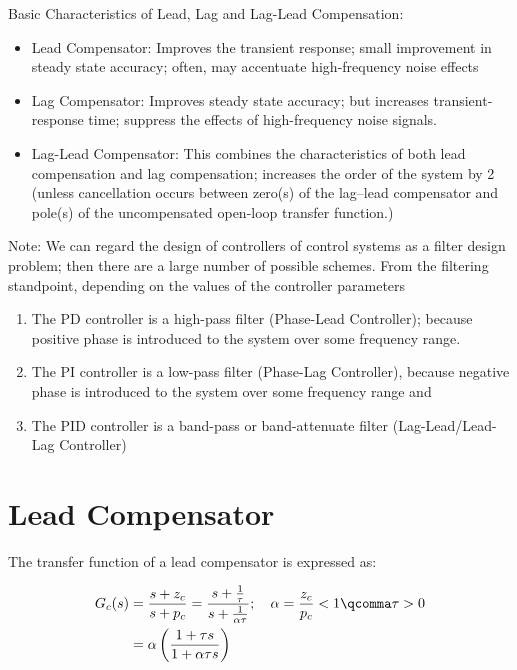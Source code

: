 \documentclass[
  14pt,
  a4paper,
  oneside,
  open=any,
  a4paper,
  14pt]{report}
\begin{document}
Basic Characteristics of Lead, Lag and Lag-Lead Compensation:

\begin{itemize}
\item
  Lead Compensator: Improves the transient response; small improvement
  in steady state accuracy; often, may accentuate high-frequency noise
  effects
\item
  Lag Compensator: Improves steady state accuracy; but increases
  transient-response time; suppress the effects of high-frequency noise
  signals.
\item
  Lag-Lead Compensator: This combines the characteristics of both lead
  compensation and lag compensation; increases the order of the system
  by 2 (unless cancellation occurs between zero(s) of the lag--lead
  compensator and pole(s) of the uncompensated open-loop transfer
  function.)
\end{itemize}

Note: We can regard the design of controllers of control systems as a
filter design problem; then there are a large number of possible
schemes. From the filtering standpoint, depending on the values of the
controller parameters

\begin{enumerate}
\def\labelenumi{\arabic{enumi}.}
\item
  The PD controller is a high-pass filter (Phase-Lead Controller);
  because positive phase is introduced to the system over some frequency
  range.
\item
  The PI controller is a low-pass filter (Phase-Lag Controller), because
  negative phase is introduced to the system over some frequency range
  and
\item
  The PID controller is a band-pass or band-attenuate filter
  (Lag-Lead/Lead-Lag Controller)
\end{enumerate}

\section{Lead Compensator}\label{lead-compensator}

The transfer function of a lead compensator is expressed as:

\[
\begin{aligned}
    G_c(s) &= \dfrac{s+z_c}{s+p_c} = \dfrac{s+\frac{1}{\tau}}{s + \frac{1}{\alpha\tau}}; \quad \alpha = \dfrac{z_c}{p_c} < 1 \qcomma \tau > 0 \\
    &= \alpha \left(\dfrac{1+\tau s}{1+\alpha \tau s} \right)
\end{aligned}
\]
\end{document}
